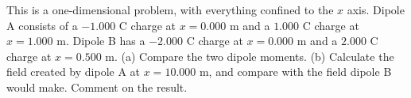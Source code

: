 This is a one-dimensional problem, with everything confined to
        the $x$ axis. Dipole A consists of a $-1.000$ C charge at $x=0.000$ m
        and a $1.000$ C charge at $x=1.000$ m. Dipole B has
        a $-2.000$ C charge at $x=0.000$ m
        and a $2.000$ C charge at $x=0.500$ m.\hwendpart
        (a) Compare the two dipole moments.\hwendpart
        (b) Calculate the field created by dipole A at $x=10.000$ m,
        and compare with the field dipole B would make. Comment on the
        result.\answercheck
